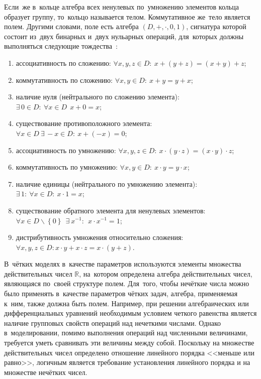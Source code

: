 Если~же в~кольце алгебра всех ненулевых по~умножению элементов кольца образует группу, то~кольцо называется телом. Коммутативное же~тело является полем. Другими словами, поле есть алгебра $\left( D,+,\cdot ,0,1 \right)$, сигнатура которой состоит из~двух бинарных и~двух нульарных операций, для~которых должны выполняться следующие тождества~\cite{Adelson_Velskiy, Bauman_DM, Yakhyaeva}:
\begin{enumerate}
	\item ассоциативность по сложению: $\forall x,y,z\in D:\ x+\left( y+z \right)=\left( x+y \right)+z$;
	\item коммутативность по сложению: $\forall x,y\in D:\ x+y=y+x$;
	\item наличие нуля (нейтрального по сложению элемента): $\exists \,0\in D:\ \forall x\in D\ \ x+0=x$;
	\item существование противоположного элемента:$\forall x\in D\ \exists \,-x\in D:\ x+\left( -x \right)=0$;
	\item ассоциативность по умножению: $\forall x,y,z\in D:\ x\cdot \left( y\cdot z \right)=\left( x\cdot y \right)\cdot z$;
	\item коммутативность по умножению: $\forall x,y\in D:\ x\cdot y=y\cdot x$;
	\item наличие единицы (нейтрального по умножению элемента): $\exists \,1:\ \forall x\in D:\ x\cdot 1=x$;
	\item существование обратного элемента для ненулевых элементов: $\forall x\in D\backslash \left\{ 0 \right\}\ \ \exists \ {{x}^{-1}}:\ \ x\cdot {{x}^{-1}}=1$;
	\item дистрибутивность умножения относительно сложения: $\forall x,y,z\in D:x\cdot y+x\cdot z=x\cdot \left( y+z \right)$.
\end{enumerate}

В~чётких моделях в~качестве параметров используются элементы множества действительных чисел $\mathbb{R}$, на~котором определена алгебра действительных чисел, являющаяся по~своей структуре полем. Для~того, чтобы нечёткие числа можно было применять в~качестве параметров чётких задач, алгебра, применяемая к~ним, также должна быть полем. Например, при решении алгебраических или дифференциальных уравнений необходимым условием четкого равенства является наличие групповых свойств операций над нечеткими числами. Однако в~моделировании, помимо выполнения операций над численными величинами, требуется уметь сравнивать эти величины между собой. Поскольку на множестве действительных чисел определено отношение линейного порядка <<меньше или равно>>, логичным является требование установления линейного порядка и на множестве нечётких чисел.

